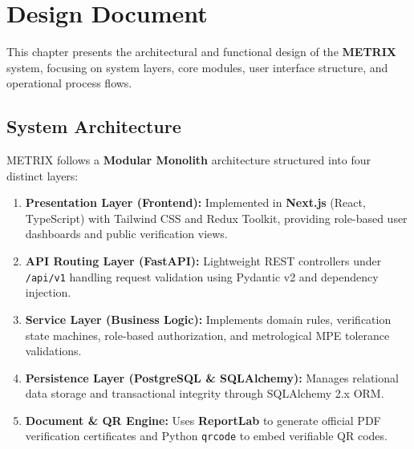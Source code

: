 \chapter{Design Document}

This chapter presents the architectural and functional design of the \textbf{METRIX} system, focusing on system layers, core modules, user interface structure, and operational process flows.

\section{System Architecture}
METRIX follows a \textbf{Modular Monolith} architecture structured into four distinct layers:
\begin{enumerate}
    \item \textbf{Presentation Layer (Frontend):} Implemented in \textbf{Next.js} (React, TypeScript) with Tailwind CSS and Redux Toolkit, providing role-based user dashboards and public verification views.
    \item \textbf{API Routing Layer (FastAPI):} Lightweight REST controllers under \texttt{/api/v1} handling request validation using Pydantic v2 and dependency injection.
    \item \textbf{Service Layer (Business Logic):} Implements domain rules, verification state machines, role-based authorization, and metrological MPE tolerance validations.
    \item \textbf{Persistence Layer (PostgreSQL \& SQLAlchemy):} Manages relational data storage and transactional integrity through SQLAlchemy 2.x ORM.
    \item \textbf{Document \& QR Engine:} Uses \textbf{ReportLab} to generate official PDF verification certificates and Python \texttt{qrcode} to embed verifiable QR codes.
\end{enumerate}

